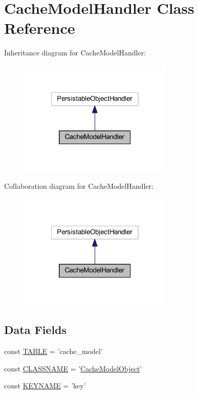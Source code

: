 \hypertarget{class_cache_model_handler}{\section{Cache\-Model\-Handler Class Reference}
\label{class_cache_model_handler}
}


Inheritance diagram for Cache\-Model\-Handler\-:
\nopagebreak
\begin{figure}[H]
\begin{center}
\leavevmode
\includegraphics[width=206pt]{class_cache_model_handler__inherit__graph}
\end{center}
\end{figure}


Collaboration diagram for Cache\-Model\-Handler\-:
\nopagebreak
\begin{figure}[H]
\begin{center}
\leavevmode
\includegraphics[width=206pt]{class_cache_model_handler__coll__graph}
\end{center}
\end{figure}
\subsection*{Data Fields}
\begin{DoxyCompactItemize}
\item 
const \hyperlink{class_cache_model_handler_adf62e2b172196282218b1ece3d200fa1}{T\-A\-B\-L\-E} = 'cache\-\_\-model'
\item 
const \hyperlink{class_cache_model_handler_af8eef153e1171aa600855d5dff3cb3b7}{C\-L\-A\-S\-S\-N\-A\-M\-E} = '\hyperlink{class_cache_model_object}{Cache\-Model\-Object}'
\item 
const \hyperlink{class_cache_model_handler_aadb8b621c723279823aea9639ceee67e}{K\-E\-Y\-N\-A\-M\-E} = 'key'
\end{DoxyCompactItemize}


